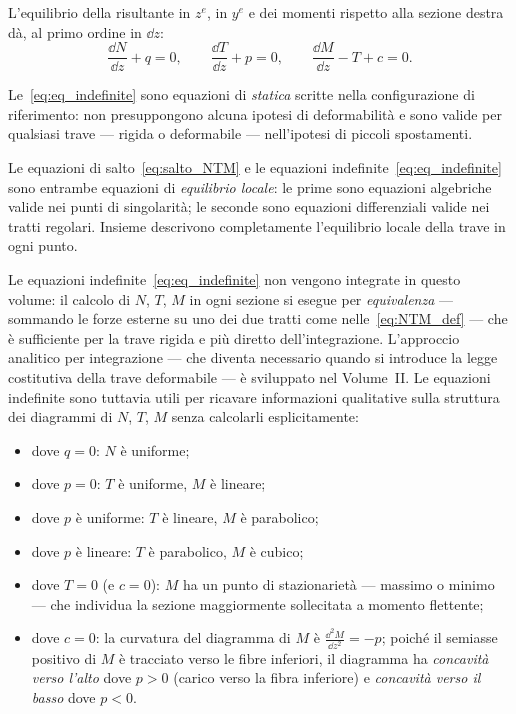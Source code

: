 L'equilibrio della risultante in $z^e$, in $y^e$
e dei momenti rispetto alla sezione destra dà,
al primo ordine in $\dd z$:
\begin{equation}\label{eq:eq_indefinite}
	\boxed{\frac{\dd N}{\dd z} + q = 0,
		\qquad
		\frac{\dd T}{\dd z} + p = 0,
		\qquad
		\frac{\dd M}{\dd z} - T + c = 0.}
\end{equation}

\begin{oss}
	Le~\eqref{eq:eq_indefinite} sono equazioni di
	\emph{statica} scritte nella configurazione
	di riferimento: non presuppongono alcuna
	ipotesi di deformabilità e sono valide per
	qualsiasi trave --- rigida o deformabile ---
	nell'ipotesi di piccoli spostamenti.
\end{oss}

\begin{oss}
	Le equazioni di salto~\eqref{eq:salto_NTM}
	e le equazioni indefinite~\eqref{eq:eq_indefinite}
	sono entrambe equazioni di \emph{equilibrio
		locale}: le prime sono equazioni algebriche
	valide nei punti di singolarità; le seconde
	sono equazioni differenziali valide nei tratti
	regolari. Insieme descrivono completamente
	l'equilibrio locale della trave in ogni punto.
\end{oss}


Le equazioni indefinite~\eqref{eq:eq_indefinite}
non vengono integrate in questo volume: il calcolo
di $N$, $T$, $M$ in ogni sezione si esegue per
\emph{equivalenza} --- sommando le forze esterne
su uno dei due tratti come nelle~\eqref{eq:NTM_def}
--- che è sufficiente per la trave rigida e più
diretto dell'integrazione. L'approccio analitico
per integrazione --- che diventa necessario quando
si introduce la legge costitutiva della trave
deformabile --- è sviluppato nel Volume~II.
Le equazioni indefinite sono tuttavia utili
per ricavare informazioni qualitative sulla
struttura dei diagrammi di $N$, $T$, $M$
senza calcolarli esplicitamente:
\begin{itemize}[nosep]
	\item dove $q = 0$: $N$ è uniforme;
	\item dove $p = 0$: $T$ è uniforme,
	$M$ è lineare;
	\item dove $p$ è uniforme: $T$ è lineare,
	$M$ è parabolico;
	\item dove $p$ è lineare: $T$ è parabolico,
	$M$ è cubico;
	\item dove $T = 0$ (e $c = 0$): $M$ ha un
	punto di stazionarietà --- massimo o minimo
	--- che individua la sezione maggiormente
	sollecitata a momento flettente;
	\item dove $c = 0$: la curvatura del diagramma
	di $M$ è $\frac{\dd^2 M}{\dd z^2} = -p$;
	poiché il semiasse positivo di $M$ è tracciato
	verso le fibre inferiori, il diagramma ha
	\emph{concavità verso l'alto} dove $p > 0$
	(carico verso la fibra inferiore) e
	\emph{concavità verso il basso} dove $p < 0$.
\end{itemize}




